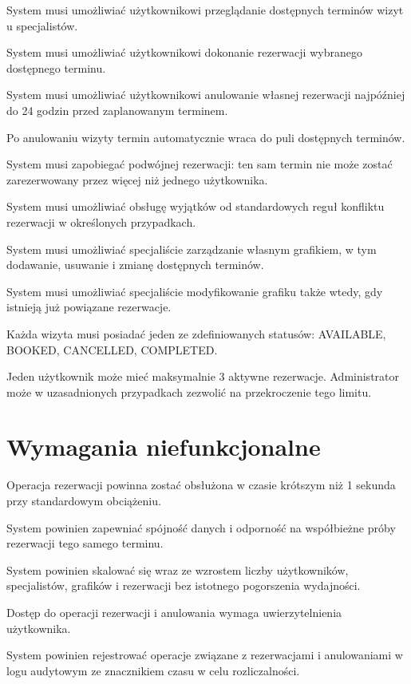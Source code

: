 \documentclass[12pt,a4paper]{article}
\begin{document}
\begin{description}[leftmargin=1.8cm, labelwidth=1.3cm, labelsep=0.5cm, style=nextline]
  \item[FR1] System musi umożliwiać użytkownikowi przeglądanie dostępnych terminów wizyt u specjalistów.
  \item[FR2] System musi umożliwiać użytkownikowi dokonanie rezerwacji wybranego dostępnego terminu.
  \item[FR3] System musi umożliwiać użytkownikowi anulowanie własnej rezerwacji najpóźniej do 24 godzin przed zaplanowanym terminem.
  \item[FR4] Po anulowaniu wizyty termin automatycznie wraca do puli dostępnych terminów.
  \item[FR5] System musi zapobiegać podwójnej rezerwacji: ten sam termin nie może zostać zarezerwowany przez więcej niż jednego użytkownika.
  \item[FR6] System musi umożliwiać obsługę wyjątków od standardowych reguł konfliktu rezerwacji w określonych przypadkach.
  \item[FR7] System musi umożliwiać specjaliście zarządzanie własnym grafikiem, w tym dodawanie, usuwanie i zmianę dostępnych terminów.
  \item[FR8] System musi umożliwiać specjaliście modyfikowanie grafiku także wtedy, gdy istnieją już powiązane rezerwacje.
  \item[FR9] Każda wizyta musi posiadać jeden ze zdefiniowanych statusów: AVAILABLE, BOOKED, CANCELLED, COMPLETED.
  \item[FR10] Jeden użytkownik może mieć maksymalnie 3 aktywne rezerwacje. Administrator może w uzasadnionych przypadkach zezwolić na przekroczenie tego limitu.
\end{description}

\section{Wymagania niefunkcjonalne}

\begin{description}[leftmargin=1.8cm, labelwidth=1.3cm, labelsep=0.5cm, style=nextline]
  \item[NFR1] Operacja rezerwacji powinna zostać obsłużona w czasie krótszym niż 1 sekunda przy standardowym obciążeniu.
  \item[NFR2] System powinien zapewniać spójność danych i odporność na współbieżne próby rezerwacji tego samego terminu.
  \item[NFR3] System powinien skalować się wraz ze wzrostem liczby użytkowników, specjalistów, grafików i rezerwacji bez istotnego pogorszenia wydajności.
  \item[NFR4] Dostęp do operacji rezerwacji i anulowania wymaga uwierzytelnienia użytkownika.
  \item[NFR5] System powinien rejestrować operacje związane z rezerwacjami i anulowaniami w logu audytowym ze znacznikiem czasu w celu rozliczalności.
\end{description}
\end{document}
